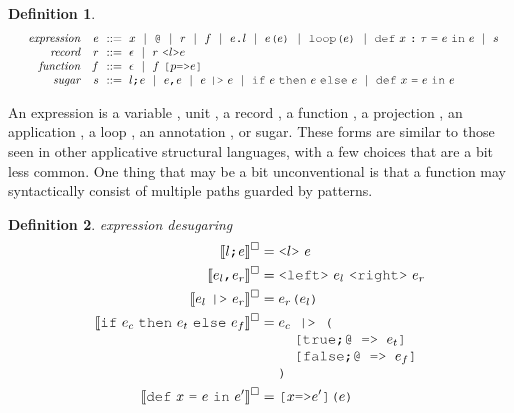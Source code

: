 \documentclass[table,dvipsnames,acmsmall]{acmart}
\theoremstyle{definition}
\newtheorem{definition}{Definition}[section]
\begin{document}
\begin{definition}
  \label{def:expression}
  \nopad 
  \small
  \[\begin{array}[t]{rr@{}l}
    \com{expression} &
    \nonterm{e} 
    & 
    \is 
    \begin{array}[t]{@{}l}
      x \sep 
      \J{@} \sep
      r \sep
      f \sep 
      e\J{.}l \sep
      e\J{(}e\J{)} \sep
      \J{loop(}e\J{)} \sep
      \J{def}\ x\ \J{:}\ \tau\ \J{=}\ e\ \J{in}\ e \sep
      s
    \end{array}
    \\
    \com{record} &
    \nonterm{r} & \is \epsilon \sep r\ \J{<}l\J{>}e 
    \\
    \com{function} &
    \nonterm{f} & \is \epsilon \sep f\ \J{[}p\J{=>}e \J{]}
    \\
    \com{sugar} &
    \nonterm{s} 
    & 
    \is 
    \begin{array}[t]{@{}l}
      l \J{;} e \sep
      e \J{,} e \sep
      e\ \J{|>}\ e \sep
      \J{if}\ e\ \J{then}\ e\ \J{else}\ e \sep
      \J{def}\ x\ \J{=}\ e\ \J{in}\ e
    \end{array}
  \end{array}\]
\end{definition}

\noindent
An expression is a variable , unit ,
a record , a function , 
a projection , an application , 
a loop ,
an annotation ,
or sugar.
These forms are similar to those seen in other applicative structural languages,
with a few choices that are a bit less common. One thing that may be
a bit unconventional is that a function may syntactically consist of 
multiple paths guarded by patterns.  

\begin{definition} 
  \label{def:expression_desugaring}
  \emph{expression desugaring}
  \hfill
  \small
  \nopad
  \begin{align*}
      \llbracket l \J{;} e \rrbracket^\square &= \J{<}l \J{>}\ e
      \\
      \llbracket e_l \J{,} e_r \rrbracket^\square &= \J{<left>}\ e_l \ \J{<right>}\ e_r
      \\
      \llbracket e_l\ \J{|>}\ e_r \rrbracket^\square &= e_r\J{(}e_l\J{)}
      \\
      \llbracket \J{if}\ e_c\ \J{then}\ e_t\ \J{else}\ e_f \rrbracket^\square &= 
      \begin{array}[t]{@{} l}
        e_c \J{ |> (}
          \\
          \I \J{[true;@ => } e_t \J{]}
          \\
          \I \J{[false;@ => } e_f \J{]}
          \\
        \J{)}
      \end{array}
      \\
      \llbracket \J{def}\ x\ \J{=}\ e\ \J{in}\ e' \rrbracket^\square &= \J{[}x \J{=>} e'\J{]}\J{(}e\J{)}
  \end{align*}

\end{definition} 
\end{document}
